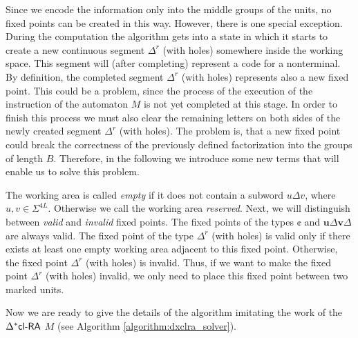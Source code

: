 Since we encode the information only into the middle groups of the units, no fixed points can be created in this way. However, there is one special exception. During the computation the algorithm gets into a state in which it starts to create a new continuous segment $\Delta^r$ (with holes) somewhere inside the working space. This segment will (after completing) represent a code for a nonterminal. By definition, the completed segment $\Delta^r$ (with holes) represents also a new fixed point. This could be a problem, since the process of the execution of the instruction of the automaton $M$ is not yet completed at this stage. In order to finish this process we must also clear the remaining letters on both sides of the newly created segment $\Delta^r$ (with holes). The problem is, that a new fixed point could break the correctness of the previously defined factorization into the groups of length $B$. Therefore, in the following we introduce some new terms that will enable us to solve this problem.

The working area is called \emph{empty} if it does not contain a subword $u \Delta v$, where $u, v \in \Sigma^{4L}$. Otherwise we call the working area \emph{reserved}. Next, we will distinguish between \emph{valid} and \emph{invalid} fixed points. The fixed points of the types $\cent$ and $\mathbf{u} \Delta \mathbf{v} \Delta$ are always valid. The fixed point of the type $\Delta^r$ (with holes) is valid only if there exists at least one empty working area adjacent to this fixed point. Otherwise, the fixed point $\Delta^r$ (with holes) is invalid. Thus, if we want to make the fixed point $\Delta^r$ (with holes) invalid, we only need to place this fixed point between two marked units.

Now we are ready to give the details of the algorithm imitating the work of the $\textup{\sf $\Delta^*$cl-RA\/}$ $M$ (see Algorithm \ref{algorithm:dxclra_solver}).

